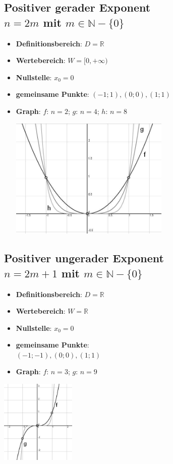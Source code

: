 \subsection*{Positiver gerader Exponent\\ $n = 2m$ mit $ m \in \mathbb{N}-\{0\}$}
\begin{itemize}
	\item \textbf{Definitionsbereich}: $ D = \mathbb{R} $
	\item \textbf{Wertebereich}: $ W = [0, + \infty) $
	\item \textbf{Nullstelle}: $ x_0 = 0 $
	\item \textbf{gemeinsame Punkte}: $(-1;1), (0;0), (1;1) $
	\item \textbf{Graph}: $f$: $n=2$; $g$: $n=4$; $h$: $n=8$ \\ 
\begin{center}
	\includegraphics[width=0.60\textwidth]{img/P1.jpg}
\end{center}
\end{itemize}

\subsection*{Positiver ungerader Exponent\\ $n = 2m+1$ mit $ m \in \mathbb{N}-\{0\}$}
\begin{minipage}{.5\textwidth}
\begin{itemize}
	\item \textbf{Definitionsbereich}: $ D = \mathbb{R} $
	\item \textbf{Wertebereich}: $ W = \mathbb{R} $
	\item \textbf{Nullstelle}: $ x_0 = 0 $
	\item \textbf{gemeinsame Punkte}:\\ $(-1;-1), (0;0), (1;1) $
	\item \textbf{Graph}: $f$: $n = 3$; $g$: $n=9$ \\
\end{itemize}
\end{minipage}
\begin{minipage}{.5\textwidth}
		\includegraphics[height=4cm]{img/P2.jpg}
\end{minipage}


